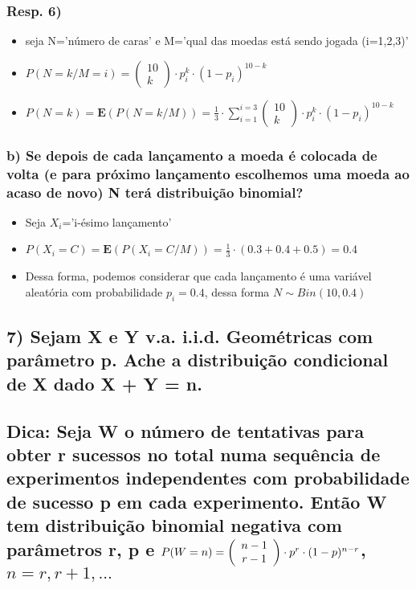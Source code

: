 \documentclass[portuguese]{article}
\begin{document}
\subsubsection*{\textmd{Resp. 6)}}
\begin{itemize}
\item seja N='número de caras' e M='qual das moedas está sendo jogada (i=1,2,3)'
\item $P(N=k/M=i)=\left(\begin{array}{c}
10\\
k
\end{array}\right)\cdot p_{i}^{k}\cdot(1-p_{i})^{10-k}$
\item $P(N=k)=\mathbf{E}(P(N=k/M))=\frac{1}{3}\cdot\sum_{i=1}^{i=3}\left(\begin{array}{c}
10\\
k
\end{array}\right)\cdot p_{i}^{k}\cdot(1-p_{i})^{10-k}$
\end{itemize}

\subsubsection*{\textmd{b) Se depois de cada lançamento a moeda é colocada de volta
(e para próximo lançamento escolhemos uma moeda ao acaso de novo)
N terá distribuição binomial?}}
\begin{itemize}
\item Seja $X_{i}$='i-ésimo lançamento'
\item $P(X_{i}=C)=\mathbf{E}(P(X_{i}=C/M))=\frac{1}{3}\cdot(0.3+0.4+0.5)=0.4$
\item Dessa forma, podemos considerar que cada lançamento é uma variável
aleatória com probabilidade $p_{i}=0.4$, dessa forma $N\sim Bin(10,0.4)$
\end{itemize}

\subsection*{\textcompwordmark{}}


\subsection*{\textmd{7) Sejam X e Y v.a. i.i.d. Geométricas com parâmetro p. Ache
a distribuição condicional de X dado X + Y = n. }}


\subsection*{\textmd{Dica: Seja W o número de tentativas para obter r sucessos
no total numa sequência de experimentos independentes com probabilidade
de sucesso p em cada experimento. Então W tem distribuição binomial
negativa com parâmetros r, p e $P(W=n)=\left(\protect\begin{array}{c}
n-1\protect\\
r-1
\protect\end{array}\right)\cdot p^{r}\cdot(1-p)^{n-r}$, $n=r,r+1,...$}}
\end{document}
